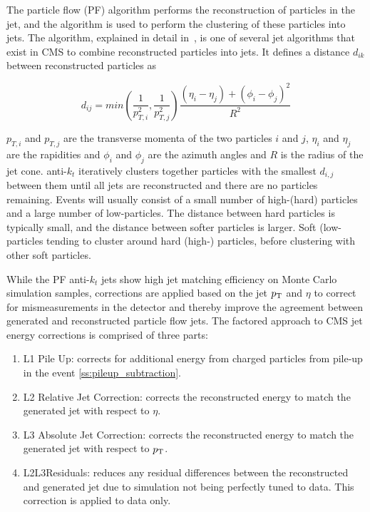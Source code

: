 The particle flow (PF) algorithm performs the reconstruction of particles in the jet, and the \antikt
algorithm is used to perform the clustering of these particles into jets. The \antikt algorithm, explained in
detail in~\cite{Cacciari:2008gp}, is one of several jet algorithms that exist in CMS to combine reconstructed
particles into jets. It defines a distance $d_{ik}$ between reconstructed particles as

\begin{equation}
d_{ij} =
min\left(\frac{1}{p_{T,i}^{2}},\frac{1}{p_{T,j}^{2}}\right)\frac{(\eta_{i}-\eta_{j})+(\phi_{i}-\phi_{j})^{2}}{R^{2}}
\end{equation}

$p_{T,i}$ and $p_{T,j}$ are the transverse momenta of the two particles $i$ and $j$, $\eta_{i}$ and $\eta_{j}$
are the rapidities and $\phi_{i}$ and $\phi_{j}$ are the azimuth angles and $R$ is the radius of the jet cone.
anti-$k_{t}$ iteratively clusters together particles with the smallest $d_{i,j}$ between them until all jets
are reconstructed and there are no particles remaining. Events will usually consist of a small number of
high-\pt (hard) particles and a large number of low-\pt particles. The distance between hard particles
is typically small, and the distance between softer particles is larger. Soft (low-\pt particles tending to
cluster around hard (high-\pt) particles, before clustering with other soft particles.

While the PF anti-$k_{t}$ jets show high jet matching efficiency on Monte Carlo simulation samples,
corrections are applied based on the jet $p_{\mathrm{T}}$ and $\eta$ to correct for mismeasurements in the
detector and thereby improve the agreement between generated and reconstructed particle flow jets. The
factored approach to CMS jet energy corrections is comprised of three parts:

\begin{enumerate}
  \item {L1 Pile Up: corrects for additional energy from charged particles from pile-up in the event
  \ref{ss:pileup_subtraction}.}
  \item {L2 Relative Jet Correction: corrects the reconstructed energy to match the generated jet with respect
  to $\eta$.} %
  \item {L3 Absolute Jet Correction: corrects the reconstructed energy to match the generated jet with respect
  to $p_{\mathrm{T}}$.} %
  \item {L2L3Residuals: reduces any residual differences between the reconstructed and generated
  jet due to simulation not being perfectly tuned to data. This correction is applied to data only.}
\end{enumerate}

